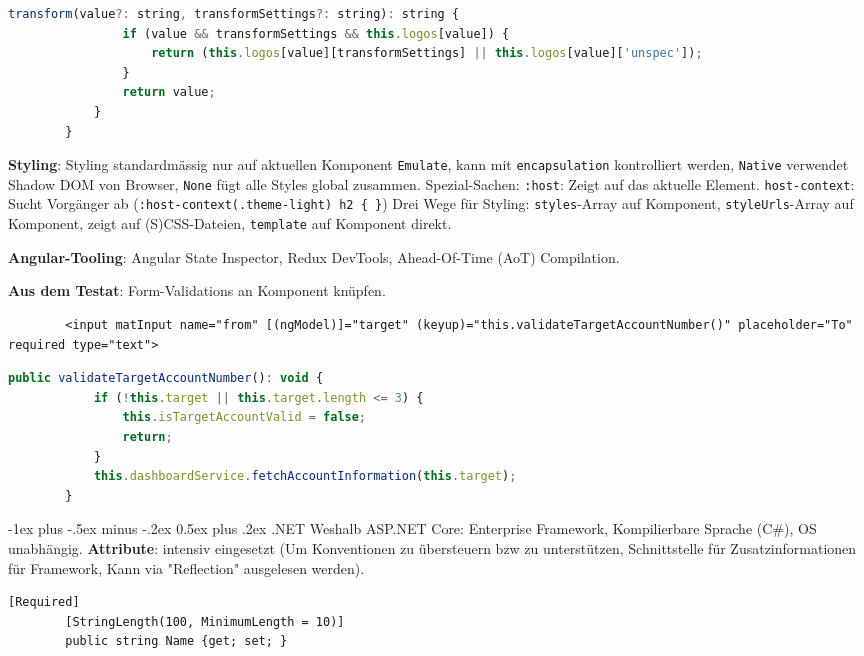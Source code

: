 \documentclass[10pt,landscape]{article}
\makeatletter
\renewcommand{\section}{\@startsection{section}{1}{0mm}%
{-1ex plus -.5ex minus -.2ex}%
{0.5ex plus .2ex}%
{\normalfont\large\bfseries}}
\makeatother
\begin{document}
\begin{multicols}{2}
\begin{lstlisting}[language=JavaScript]
            transform(value?: string, transformSettings?: string): string {
                if (value && transformSettings && this.logos[value]) {
                    return (this.logos[value][transformSettings] || this.logos[value]['unspec']);
                }
                return value;
            }
        }
        \end{lstlisting}

        \textbf{Styling}: Styling standardmässig nur auf aktuellen Komponent \lstinline{Emulate}, kann mit \lstinline{encapsulation} kontrolliert werden, \lstinline{Native} verwendet Shadow DOM von Browser, \lstinline{None} fügt alle Styles global zusammen.
        Spezial-Sachen: \lstinline{:host}: Zeigt auf das aktuelle Element.
        \lstinline{host-context}: Sucht Vorgänger ab (\lstinline!:host-context(.theme-light) h2 { }!)
        Drei Wege für Styling: \lstinline{styles}-Array auf Komponent, \lstinline{styleUrls}-Array auf Komponent, zeigt auf (S)CSS-Dateien, \lstinline{template} auf Komponent direkt.

        \textbf{Angular-Tooling}: Angular State Inspector, Redux DevTools, Ahead-Of-Time (AoT) Compilation.

        \textbf{Aus dem Testat}: Form-Validations an Komponent knüpfen.

        \begin{lstlisting}
        <input matInput name="from" [(ngModel)]="target" (keyup)="this.validateTargetAccountNumber()" placeholder="To" required type="text">
        \end{lstlisting}\begin{lstlisting}[language=JavaScript]
        public validateTargetAccountNumber(): void {
            if (!this.target || this.target.length <= 3) {
                this.isTargetAccountValid = false;
                return;
            }
            this.dashboardService.fetchAccountInformation(this.target);
        }
        \end{lstlisting}

        \section{.NET}
        Weshalb ASP.NET Core: Enterprise Framework, Kompilierbare Sprache (C\#), OS unabhängig.
        \textbf{Attribute}: intensiv eingesetzt (Um Konventionen zu übersteuern bzw zu unterstützen, Schnittstelle für Zusatzinformationen für Framework, Kann via "Reflection" ausgelesen werden).
        \begin{lstlisting}[style=CSharp]
        [Required]
        [StringLength(100, MinimumLength = 10)]
        public string Name {get; set; }


\end{lstlisting}
\end{multicols}
\end{document}
